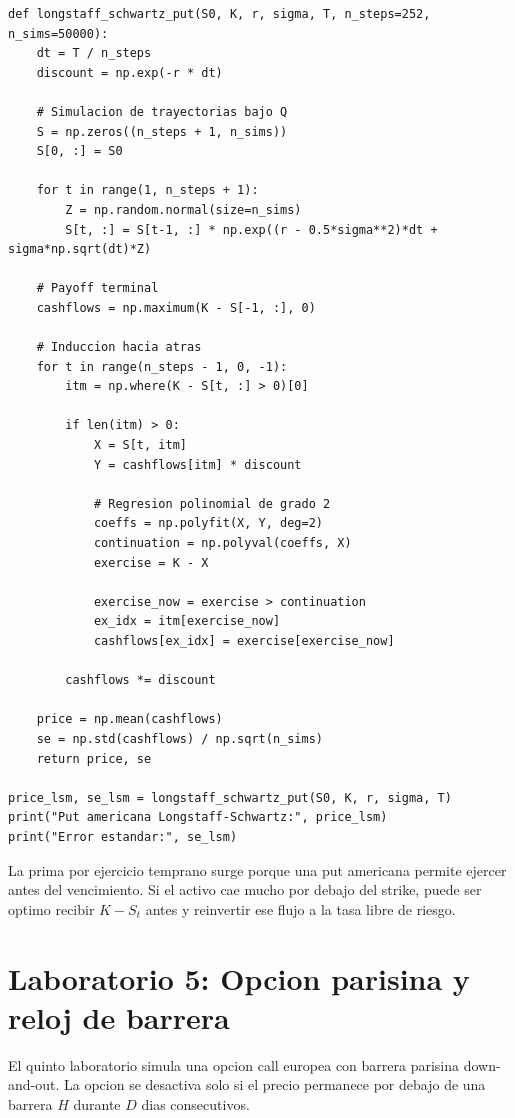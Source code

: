 \documentclass[12pt,a4paper]{article}
\begin{document}
\begin{lstlisting}[style=pythonstyle]
def longstaff_schwartz_put(S0, K, r, sigma, T, n_steps=252, n_sims=50000):
    dt = T / n_steps
    discount = np.exp(-r * dt)

    # Simulacion de trayectorias bajo Q
    S = np.zeros((n_steps + 1, n_sims))
    S[0, :] = S0

    for t in range(1, n_steps + 1):
        Z = np.random.normal(size=n_sims)
        S[t, :] = S[t-1, :] * np.exp((r - 0.5*sigma**2)*dt + sigma*np.sqrt(dt)*Z)

    # Payoff terminal
    cashflows = np.maximum(K - S[-1, :], 0)

    # Induccion hacia atras
    for t in range(n_steps - 1, 0, -1):
        itm = np.where(K - S[t, :] > 0)[0]

        if len(itm) > 0:
            X = S[t, itm]
            Y = cashflows[itm] * discount

            # Regresion polinomial de grado 2
            coeffs = np.polyfit(X, Y, deg=2)
            continuation = np.polyval(coeffs, X)
            exercise = K - X

            exercise_now = exercise > continuation
            ex_idx = itm[exercise_now]
            cashflows[ex_idx] = exercise[exercise_now]

        cashflows *= discount

    price = np.mean(cashflows)
    se = np.std(cashflows) / np.sqrt(n_sims)
    return price, se

price_lsm, se_lsm = longstaff_schwartz_put(S0, K, r, sigma, T)
print("Put americana Longstaff-Schwartz:", price_lsm)
print("Error estandar:", se_lsm)
\end{lstlisting}

\begin{interpretacion}
La prima por ejercicio temprano surge porque una put americana permite ejercer antes del vencimiento. Si el activo cae mucho por debajo del strike, puede ser optimo recibir \(K-S_t\) antes y reinvertir ese flujo a la tasa libre de riesgo.
\end{interpretacion}

\section{Laboratorio 5: Opcion parisina y reloj de barrera}

\begin{markdowncell}
El quinto laboratorio simula una opcion call europea con barrera parisina down-and-out. La opcion se desactiva solo si el precio permanece por debajo de una barrera \(H\) durante \(D\) dias consecutivos.
\end{markdowncell}
\end{document}
